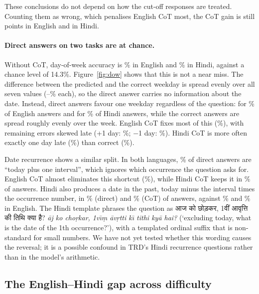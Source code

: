 These conclusions do not depend on how the cut-off responses are treated. Counting them as wrong, which penalises English CoT most, the CoT gain is still \EnStrictDelta{} points in English and \HiStrictDelta{} in Hindi.

\paragraph{Direct answers on two tasks are at chance.}

Without CoT, day-of-week accuracy is \EnDowDirect{}\% in English and \HiDowDirect{}\% in Hindi, against a chance level of 14.3\%. Figure~\ref{fig:dow} shows that this is not a near miss. The difference between the predicted and the correct weekday is spread evenly over all seven values (\EnDowDirectMin{}--\HiDowDirectMax{}\% each), so the direct answer carries no information about the date. Instead, direct answers favour one weekday regardless of the question: \EnDowModeDay{} for \EnDowModeShare{}\% of English answers and \HiDowModeDay{} for \HiDowModeShare{}\% of Hindi answers, while the correct answers are spread roughly evenly over the week. English CoT fixes most of this (\EnDowCot{}\%), with remaining errors skewed late (+1 day: \EnDowCotPlusOne{}\%; $-$1 day: \EnDowCotMinusOne{}\%). Hindi CoT is more often exactly one day late (\HiDowCotPlusOne{}\%) than correct (\HiDowCotZero{}\%).

Date recurrence shows a similar split. In both languages, \EnRecDirectFirstStep{}\% of direct answers are ``today plus one interval'', which ignores which occurrence the question asks for. English CoT almost eliminates this shortcut (\EnRecCotFirstStep{}\%), while Hindi CoT keeps it in \HiRecCotFirstStep{}\% of answers. Hindi also produces a date in the past, today minus the interval times the occurrence number, in \HiRecDirectMirror{}\% (direct) and \HiRecCotMirror{}\% (CoT) of answers, against \EnRecDirectMirror{}\% and \EnRecCotMirror{}\% in English. The Hindi template phrases the question as \foreignlanguage{hindi}{आज को छोड़कर, 1वीं आवृत्ति की तिथि क्या है?} \emph{\={a}j ko cho\d{r}kar, 1v\={\i}\d{m} \={a}v\d{r}tti k\={\i} tithi ky\={a} hai?} (`excluding today, what is the date of the 1th occurrence?'), with a templated ordinal suffix that is non-standard for small numbers. We have not yet tested whether this wording causes the reversal; it is a possible confound in TRD's Hindi recurrence questions rather than in the model's arithmetic.

\subsection{The English--Hindi gap across difficulty}
\label{sec:difficulty}


